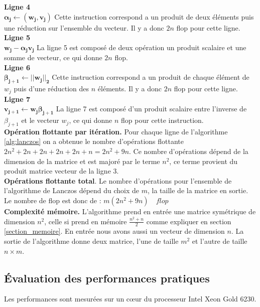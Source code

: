 \documentclass[11pt,french]{article}
\begin{document}
	\noindent \textbf{Ligne  4}\\
	$\boldsymbol {\alpha_j \gets (w_j,v_j)}$
	Cette instruction correspond a un produit de deux éléments puis une réduction sur l'ensemble du vecteur. Il y a donc $2n$ flop pour cette ligne. \\
	
	\noindent\textbf{Ligne  5}\\
	$\boldsymbol {w_j - \boldsymbol{\alpha_j} v_j}$
	La ligne 5 est composé de deux  opération un produit scalaire et une somme de vecteur, ce qui donne $2n$ flop. \\
	
	\noindent\textbf{Ligne  6}\\
	$\boldsymbol {\beta_{j+1} \gets || w_j||_2}$
	Cette instruction correspond a un produit de chaque élément de $w_j$ puis d'une réduction des $n$ éléments. Il y a donc $2n$ flop pour cette ligne.  \\
	
	\noindent\textbf{Ligne  7}\\
	$\boldsymbol {v_{j+1} \gets w_j \beta_{j+1}}$
	La ligne 7 est composé d'un produit scalaire entre l’inverse de $\beta_{j+1}$ et le vecteur $w_j$, ce qui donne $n$ flop pour cette instruction. \\ 
	
	\noindent\textbf{Opération flottante par itération.}
	Pour chaque ligne de l'algorithme \ref{alg:lanczos} on a obtenue le nombre d’opérations flottante  $2n^2 + 2n + 2n +2n +2n +n = 2n^2 + 9n$. Ce nombre d’opérations dépend de la dimension de la matrice et est majoré par le terme $n^2$, ce terme provient du produit matrice vecteur de la ligne 3. \\
	
	\noindent \textbf{Opérations flottante total}. Le nombre d’opérations pour l'ensemble de l'algorithme de Lanczos dépend du choix de $m$, la taille de la matrice en sortie. Le nombre de flop est donc de : $m(2n^2 + 9n) \quad flop $ \\
	
	\noindent\textbf{Complexité mémoire.} L'algorithme prend en entrée une matrice symétrique de dimension $n^2$, celle si prend en mémoire $\frac{n^2 + n}{2}$ comme expliquer en section \ref{section_memoire}. En entrée nous avons aussi un vecteur de dimension $n$. La sortie de l'algorithme donne deux matrice, l'une de taille $m^2$ et l'autre de taille $n \times m$.
	
	\subsection{Évaluation des performances pratiques}
	Les performances sont mesurées sur un cœur du processeur Intel Xeon Gold 6230.
\end{document}
